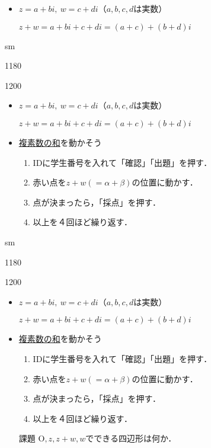 \documentclass[landscape,10pt]{ujarticle}
\newcommand{\slidepage}[1][s]{%
\setcounter{ketpicctra}{18}%
\if#1m \setcounter{ketpicctra}{1}\fi
\hypersetup{linkcolor=black}%

\begin{layer}{118}{0}
\putnotee{122}{-\theketpicctra.05}{\small\thepage/\pageref{pageend}}
\end{layer}\hypersetup{linkcolor=blue}

}
\begin{document}
\begin{itemize}
\item
$z=a+bi,\ w=c+di$（$a,b,c,d$は実数）
\item
[]$z+w=a+bi+c+di=(a+c)+(b+d)i$
\end{itemize}

\sameslide

\vspace*{18mm}

\slidepage

\begin{layer}{120}{0}
\end{layer}

\begin{itemize}
\item
$z=a+bi,\ w=c+di$（$a,b,c,d$は実数）
\item
[]$z+w=a+bi+c+di=(a+c)+(b+d)i$
\item
\href{https://s-takato.github.io/polytech22/offlineapp/fukusowa_ttttjsoffL.html}{複素数の和}を動かそう
\begin{enumerate}[(1)]
\item
IDに学生番号を入れて「確認」「出題」を押す．
\item
赤い点を$z+w(=\alpha+\beta)$の位置に動かす．
\item
点が決まったら，「採点」を押す．
\item
以上を４回ほど繰り返す．
\end{enumerate}
\end{itemize}

\sameslide

\vspace*{18mm}

\slidepage

\begin{layer}{120}{0}
\end{layer}

\begin{itemize}
\item
$z=a+bi,\ w=c+di$（$a,b,c,d$は実数）
\item
[]$z+w=a+bi+c+di=(a+c)+(b+d)i$
\item
\href{https://s-takato.github.io/polytech22/offlineapp/fukusowa_ttttjsoffL.html}{複素数の和}を動かそう
\begin{enumerate}[(1)]
\item
IDに学生番号を入れて「確認」「出題」を押す．
\item
赤い点を$z+w(=\alpha+\beta)$の位置に動かす．
\item
点が決まったら，「採点」を押す．
\item
以上を４回ほど繰り返す．
\end{enumerate}
\item
[課題]\monban $\mathrm{O},z,z+w,w$でできる四辺形は何か．
\end{itemize}
\end{document}

